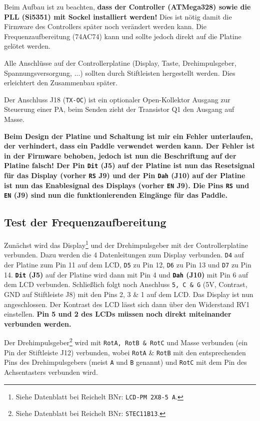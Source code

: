 \documentclass[10pt, a4paper]{paper}
\newcommand{\warn}[1]{\textbf{#1}}
\newcommand{\con}[1]{\texttt{#1}}
\begin{document}
Beim Aufbau ist zu beachten, \warn{dass der Controller (ATMega328) sowie die PLL (Si5351) mit Sockel installiert werden!} Dies ist nötig damit die Firmware des Controllers später noch verändert werden kann. Die Frequenzaufbereitung (74AC74) kann und sollte jedoch direkt auf die Platine gelötet werden. 

Alle Anschlüsse auf der Controllerplatine (Display, Taste, Drehimpulsgeber, Spannungsversorgung, ...) sollten durch Stiftleisten hergestellt werden. Dies erleichtert den Zusammenbau später.

Der Anschluss J18 (\con{TX-OC}) ist ein optionaler Open-Kollektor Ausgang zur Steuerung einer PA, beim Senden zieht der Transistor Q1 den Ausgang auf Masse.

\warn{Beim Design der Platine und Schaltung ist mir ein Fehler unterlaufen, der verhindert, dass ein Paddle verwendet werden kann. Der Fehler ist in der Firmware behoben, jedoch ist nun die Beschriftung auf der Platine falsch! Der Pin \con{Dit} (J5) auf der Platine ist nun das Resetsignal für das Display (vorher \con{RS} J9) und der Pin \con{Dah} (J10) auf der Platine ist nun das Enablesignal des Displays (vorher \con{EN} J9). Die Pins \con{RS} und \con{EN} (J9) sind nun die funktionierenden Eingänge für das Paddle.}  

\subsection{Test der Frequenzaufbereitung}
Zunächst wird das Display\footnote{Siehe Datenblatt bei Reichelt BNr: \texttt{LCD-PM 2X8-5 A}.} und der Drehimpulsgeber mit der Controllerplatine verbunden. Dazu werden die 4 Datenleitungen zum Display verbunden. \con{D4} auf der Platine zum Pin 11 auf dem LCD, \con{D5} zu Pin 12, \con{D6} zu Pin 13 und \con{D7} zu Pin 14. \warn{\con{Dit} (J5)} auf der Platine wird dann mit Pin 4 und \warn{\con{Dah} (J10)} mit Pin 6 auf dem LCD verbunden. Schließlich folgt noch Anschluss \con{5, C \& G} (5V, Contrast, GND auf Stiftleiste J8) mit den Pins 2, 3 \& 1 auf dem LCD. Das Display ist nun angeschlossen. Der Kontrast des LCD lässt sich dann über den Widerstand RV1 einstellen. \warn{Pin 5 und 2 des LCDs müssen noch direkt miteinander verbunden werden.}

Der Drehimpulsgeber\footnote{Siehe Datenblatt bei Reichelt BNr: \texttt{STEC11B13}.} wird mit \con{RotA, RotB \& RotC} und Masse verbunden (ein Pin der Stiftleiste J12) verbunden, wobei \con{RotA} \& \con{RotB} mit den entsprechenden Pins des Drehimpulsgebers (meist \con{A} und \con{B} genannt) und \con{RotC} mit dem Pin des Achsentasters verbunden wird. 
\end{document}
